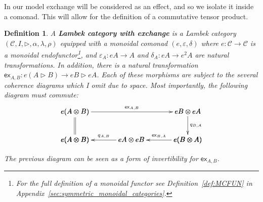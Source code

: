 \documentclass{sigplanconf}
\let\mto\to
\let\to\relax
\newcommand{\to}{\rightarrow}
\newcommand{\cat}[1]{\mathcal{#1}}
\newtheorem{definition}[theorem]{Definition}
\begin{document}
In our model exchange will be considered as an effect, and so we
isolate it inside a comonad.  This will allow for the definition of a
commutative tensor product.
\begin{definition}
  \label{def:exchange-comonad}
  A \textbf{Lambek category with exchange} is a Lambek category
  $(\cat{C}, I, \rhd, \alpha, \lambda, \rho)$ equipped with a monoidal
  comonad $(e, \varepsilon, \delta)$ where $e : \cat{C} \mto \cat{C}$
  is a monoidal endofunctor\footnote{For the full definition of a
    monoidal functor see Definition~\ref{def:MCFUN} in
    Appendix~\ref{sec:symmetric_monoidal_categories}.}, and
  $\varepsilon_A : eA \mto A$ and $\delta_A : eA \mto e^2A$ are
  natural transformations.  In addition, there is a natural
  transformation $\mathsf{ex}_{A,B} : e(A \rhd B) \mto eB \rhd
  eA$. Each of these morphisms are subject to the several coherence
  diagrams which I omit due to space.  Most importantly, the
  following diagram must commute:
  \[
  \bfig
    \square/->`=`->`/<1600,400>[
      e(A\otimes B)`
      eB\otimes eA`
      e(A\otimes B)`
      e(B\otimes A);
      \mathsf{ex}_{A,B}``
      q_{B,A}`]
    \morphism(800,0)<-800,0>[
      eA\otimes eB`
      e(A\otimes B);
      q_{A,B}]
    \morphism(1600,0)<-800,0>[
      e(B\otimes A)`
      eA\otimes eB;
      \mathsf{ex}_{B,A}]
    \efig
    \]
  
  
    \noindent
  The previous diagram can be seen as a form of invertibility for
  $\mathsf{ex}_{A,B}$.
\end{definition}
\end{document}
